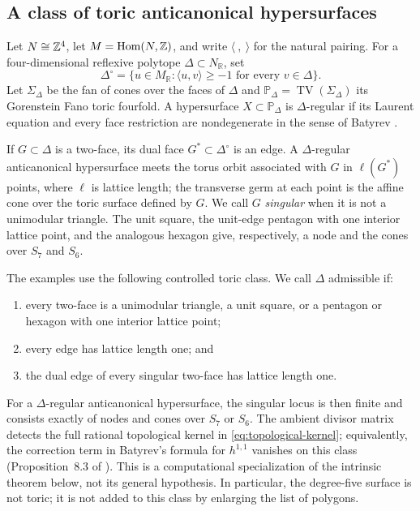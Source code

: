 \subsection{A class of toric anticanonical hypersurfaces}
\label{subsec:admissible-class}

Let $N\cong\mathbb Z^4$, let $M=\operatorname{Hom}(N,\mathbb Z)$, and write
$\langle\ ,\ \rangle$ for the natural pairing. For a four-dimensional
reflexive polytope $\Delta\subset N_{\mathbb R}$, set
\begin{equation}
 \Delta^\circ=\{u\in M_{\mathbb R}:\langle u,v\rangle\geq-1
 \text{ for every }v\in\Delta\}.
 \label{eq:polar-convention}
\end{equation}
Let $\Sigma_\Delta$ be the fan of cones over the faces of $\Delta$ and
$\mathbb P_\Delta=\operatorname{TV}(\Sigma_\Delta)$ its Gorenstein Fano
toric fourfold. A hypersurface $X\subset\mathbb P_\Delta$ is
$\Delta$-regular if its Laurent equation and every face restriction are
nondegenerate in the sense of Batyrev \cite{Batyrev:1994}.

If $G\subset\Delta$ is a two-face, its dual face $G^*\subset\Delta^\circ$
is an edge. A $\Delta$-regular anticanonical hypersurface meets the torus
orbit associated with $G$ in $\ell(G^*)$ points, where $\ell$ is lattice
length; the transverse germ at each point is the affine cone over the toric
surface defined by $G$. We call $G$ \emph{singular} when it is not a
unimodular triangle. The unit square, the unit-edge pentagon with one interior
lattice point, and the analogous hexagon give, respectively, a node and the
cones over $S_7$ and $S_6$.

The examples use the following controlled toric class. We
call $\Delta$ admissible if:
\begin{enumerate}
 \item every two-face is a unimodular triangle, a unit square, or a
 pentagon or hexagon with one interior lattice point;
 \item every edge has lattice length one; and
 \item the dual edge of every singular two-face has lattice length one.
\end{enumerate}
For a $\Delta$-regular anticanonical hypersurface, the singular locus is then
finite and consists exactly of nodes and cones over $S_7$ or $S_6$. The
ambient divisor matrix detects the full rational topological kernel in
\eqref{eq:topological-kernel}; equivalently, the correction term in
Batyrev's formula for $h^{1,1}$ \cite{Batyrev:1994} vanishes on this class
(Proposition~8.3 of \cite{Wuebben:2026obstruction}).
This is a computational specialization of the intrinsic theorem below,
not its general hypothesis. In particular, the degree-five surface is
not toric; it is not added to this class by enlarging the list of polygons.

